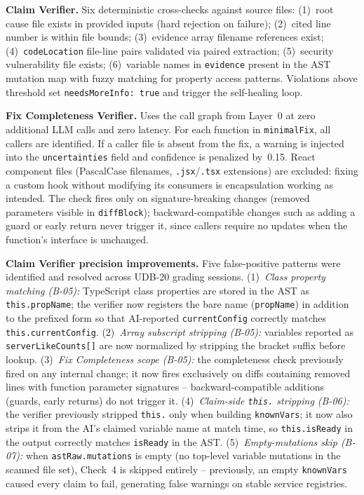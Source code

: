 \documentclass[12pt,a4paper]{article}
\newcommand{\code}[1]{\texttt{\small #1}}
\begin{document}
\vspace{6pt}
\textbf{Claim Verifier.} Six deterministic cross-checks against source files:
(1)~root cause file exists in provided inputs (hard rejection on failure);
(2)~cited line number is within file bounds;
(3)~evidence array filename references exist;
(4)~\code{codeLocation} file-line pairs validated via paired extraction;
(5)~security vulnerability file exists;
(6)~variable names in \code{evidence} present in the AST mutation map with fuzzy
matching for property access patterns. Violations above threshold set
\code{needsMoreInfo: true} and trigger the self-healing loop.

\textbf{Fix Completeness Verifier.} Uses the call graph from Layer~0 at zero additional
LLM calls and zero latency. For each function in \code{minimalFix}, all callers are
identified. If a caller file is absent from the fix, a warning is injected into the
\code{uncertainties} field and confidence is penalized by~0.15. React component files
(PascalCase filenames, \code{.jsx}/\code{.tsx} extensions) are excluded: fixing a custom
hook without modifying its consumers is encapsulation working as intended. The check fires
only on signature-breaking changes (removed parameters visible in \code{diffBlock}); backward-compatible
changes such as adding a guard or early return never trigger it, since callers require no
updates when the function's interface is unchanged.

\textbf{Claim Verifier precision improvements.} Five false-positive patterns were
identified and resolved across UDB-20 grading sessions. (1)~\textit{Class property
matching (B-05):} TypeScript class properties are stored in the AST as \code{this.propName};
the verifier now registers the bare name (\code{propName}) in addition to the prefixed
form so that AI-reported \code{currentConfig} correctly matches \code{this.currentConfig}.
(2)~\textit{Array subscript stripping (B-05):} variables reported as \code{serverLikeCounts[]}
are now normalized by stripping the bracket suffix before lookup.
(3)~\textit{Fix Completeness scope (B-05):} the completeness check previously fired on any
internal change; it now fires exclusively on diffs containing removed lines with function
parameter signatures -- backward-compatible additions (guards, early returns) do not
trigger it. (4)~\textit{Claim-side \code{this.} stripping (B-06):} the verifier
previously stripped \code{this.} only when building \code{knownVars}; it now also strips
it from the AI's claimed variable name at match time, so \code{this.isReady} in the
output correctly matches \code{isReady} in the AST. (5)~\textit{Empty-mutations skip
(B-07):} when \code{astRaw.mutations} is empty (no top-level variable mutations in the
scanned file set), Check~4 is skipped entirely -- previously, an empty \code{knownVars}
caused every claim to fail, generating false warnings on stable service registries.
\end{document}
